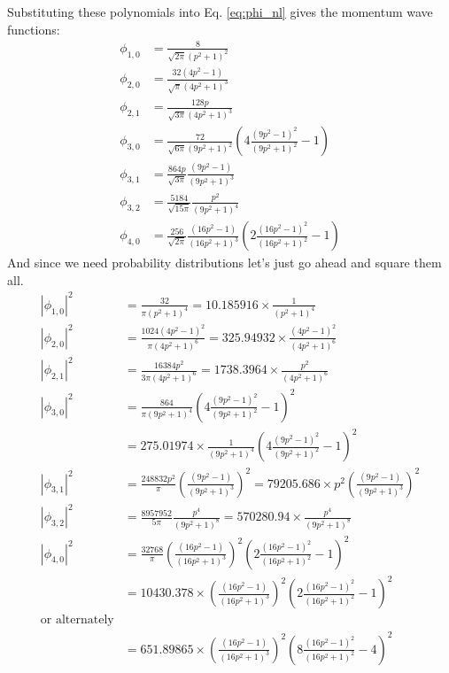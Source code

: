 \documentclass[12pt]{article}
\begin{document}
Substituting these polynomials into Eq. \ref{eq:phi_nl} gives the momentum wave functions:
\begin{align}
\phi_{1,0}&=\frac{8}{\sqrt{2\pi}(p^2+1)^2}\\
\phi_{2,0}&=\frac{32(4p^2-1)}{\sqrt{\pi}(4p^2+1)^3}\\
\phi_{2,1}&=\frac{128p}{\sqrt{3\pi}(4p^2+1)^3}\\
\phi_{3,0}&=\frac{72}{\sqrt{6\pi}(9p^2+1)^2}\left(4\frac{(9p^2-1)^2}{(9p^2+1)^2}-1\right)\\
\phi_{3,1}&=\frac{864p}{\sqrt{3\pi}}\frac{(9p^2-1)}{(9p^2+1)^3}\\
\phi_{3,2}&=\frac{5184}{\sqrt{15\pi}}\frac{p^2}{(9p^2+1)^4}\\
\phi_{4,0}&=\frac{256}{\sqrt{2\pi}}\frac{(16p^2-1)}{(16p^2+1)^3}\left(2\frac{(16p^2-1)^2}{(16p^2+1)^2}-1\right)
\end{align}
And since we need probability distributions let's just go ahead and square them all.
\begin{align}
\left|\phi_{1,0}\right|^2&=\frac{32}{\pi(p^2+1)^4}=10.185916\times\frac{1}{(p^2+1)^4}\\
\left|\phi_{2,0}\right|^2&=\frac{1024(4p^2-1)^2}{\pi(4p^2+1)^6}=325.94932\times\frac{(4p^2-1)^2}{(4p^2+1)^6}\\
\left|\phi_{2,1}\right|^2&=\frac{16384p^2}{3\pi(4p^2+1)^6}=1738.3964\times\frac{p^2}{(4p^2+1)^6}\\
\left|\phi_{3,0}\right|^2&=\frac{864}{\pi(9p^2+1)^4}\left(4\frac{(9p^2-1)^2}{(9p^2+1)^2}-1\right)^2\\~&=275.01974\times\frac{1}{(9p^2+1)^4}\left(4\frac{(9p^2-1)^2}{(9p^2+1)^2}-1\right)^2\\
\left|\phi_{3,1}\right|^2&=\frac{248832p^2}{\pi}\left(\frac{(9p^2-1)}{(9p^2+1)^3}\right)^2=79205.686\times p^2\left(\frac{(9p^2-1)}{(9p^2+1)^3}\right)^2\\
\left|\phi_{3,2}\right|^2&=\frac{8957952}{5\pi}\frac{p^4}{(9p^2+1)^8}=570280.94\times\frac{p^4}{(9p^2+1)^8}\\
\left|\phi_{4,0}\right|^2&=\frac{32768}{\pi}\left(\frac{(16p^2-1)}{(16p^2+1)^3}\right)^2\left(2\frac{(16p^2-1)^2}{(16p^2+1)^2}-1\right)^2\\~&=10430.378\times\left(\frac{(16p^2-1)}{(16p^2+1)^3}\right)^2\left(2\frac{(16p^2-1)^2}{(16p^2+1)^2}-1\right)^2\\\textrm{or alternately}\\
~&=651.89865\times\left(\frac{(16p^2-1)}{(16p^2+1)^3}\right)^2\left(8\frac{(16p^2-1)^2}{(16p^2+1)^2}-4\right)^2
\end{align}

%


\end{document}
